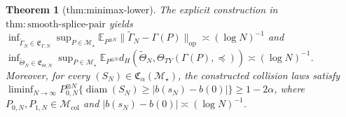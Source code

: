 \documentclass{article}
\newtheorem{theorem}{Theorem}
\begin{document}
\begin{theorem}[thm:minimax-lower]\label{thm:minimax-lower}
The explicit construction in \(\mathrm{thm:smooth\text{-}splice\text{-}pair}\) yields \(\inf_{\widetilde\Gamma_N\in\mathfrak E_{\Gamma,N}}\sup_{P\in\mathcal M_\star}\mathbb E_{P^{\otimes N}}\|\widetilde\Gamma_N-\Gamma(P)\|_{\mathrm{op}}\asymp(\log N)^{-1}\) and \(\inf_{\widetilde\Theta_N\in\mathfrak E_{\Theta,N}}\sup_{P\in\mathcal M_\star}\mathbb E_{P^{\otimes N}}d_H(\widetilde\Theta_N,\Theta_{TY}(\Gamma(P),\preceq))\asymp(\log N)^{-1}\). Moreover, for every \((S_N)\in\mathfrak C_\alpha(\mathcal M_\star)\), the constructed collision laws satisfy \(\liminf_{N\to\infty}P_{0,N}^{\otimes N}\{\operatorname{diam}(S_N)\ge|b(s_N)-b(0)|\}\ge1-2\alpha\), where \(P_{0,N},P_{1,N}\in\mathcal M_{\mathrm{col}}\) and \(|b(s_N)-b(0)|\asymp(\log N)^{-1}\).
\end{theorem}
\end{document}
